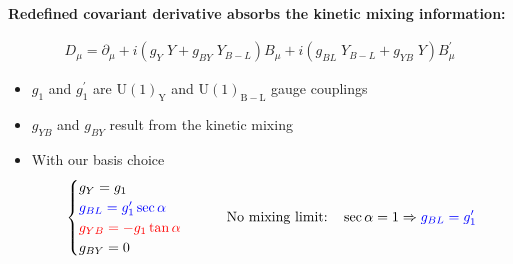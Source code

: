 \documentclass[10pt,xcolor=dvipsnames,mathserif]{beamer}
\renewcommand{\(}{\left(}
\renewcommand{\)}{\right)}
\renewcommand{\[}{\left[}
\renewcommand{\]}{\right]}
\newcommand{\U}[1]{\mathrm{U}(1)_{\mathrm{#1}}}			%
\newcommand{\blue}[0]{\color{blue}}
\newcommand{\red}[0]{\color{red}}
\begin{document}
\begin{frame}
	
	
	\textbf{Redefined covariant derivative absorbs the kinetic mixing information:}
	
	\begin{equation*}
	\begin{aligned}
	D_\mu = \partial_\mu + i \(g_Y \; Y + g_{BY} \; Y_{B-L}\) B_\mu + i \(g_{BL} \; Y_{B-L} + g_{YB} \; Y\) B_\mu^\prime
	\end{aligned}
	\end{equation*}	
	\vskip2mm
	\begin{itemize}
		\item $g_1$ and $g_1^\prime$ are $\U{Y}$ and $\U{B-L}$ gauge couplings
		\vskip2mm
		\item $g_{YB}$ and $g_{BY}$ result from the kinetic mixing
\vskip2mm
		\item With our basis choice
		 $$\begin{cases}
				g_Y = g_1 \\
				{\blue g_{BL} = g_1^\prime \sec \alpha} \\
				{\red g_{YB} = -g_1 \tan \alpha }\\
			    g_{BY} = 0
		\end{cases} 
		\qquad
		\text{No mixing limit:}\quad \sec \alpha = 1 \Rightarrow {\blue g_{BL} = g_1^\prime}$$
	\end{itemize}

\end{frame}
\end{document}
